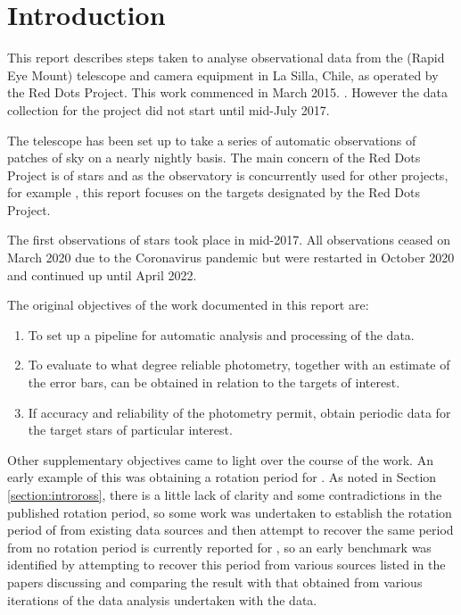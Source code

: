 \section{Introduction}
\protect\label{section:intro}

\engdate

This report describes steps taken to analyse observational data from the
{\rem} (Rapid Eye Mount) telescope and camera equipment in La Silla, Chile, as
operated by the Red Dots Project. This work commenced in March 2015.
\citep{reddotsspace20}. However the data collection for the project did not
start until mid-July 2017.

The {\rem} telescope has been set up to take a series of automatic
observations of patches of sky on a nearly nightly basis. The main concern of
the Red Dots Project is of {\rdwarf} stars and as the {\rem} observatory is
concurrently used for other projects, for example \citet{giannini18}, this
report focuses on the {\rdwarf} targets designated by the Red Dots Project.

The first observations of {\rdwarf} stars took place in mid-2017. All
observations ceased on March 2020 due to the Coronavirus pandemic but were
restarted in October 2020 and continued up until April 2022.

The original objectives of the work documented in this report are:
\begin{enumerate}
  \item To set up a pipeline for automatic analysis and processing of the data.
  \item To evaluate to what degree reliable photometry, together with an
  estimate of the error bars, can be obtained in relation to the targets of
  interest.
  \item If accuracy and reliability of the photometry permit, obtain periodic
  data for the target stars of particular interest.
\end{enumerate}

Other supplementary objectives came to light over the course of the work. An
early example of this was obtaining a rotation period for \ross. As noted in
Section \ref{section:introross}, there is a little lack of clarity and some
contradictions in the published rotation period, so some work was undertaken to
establish the rotation period of {\ross} from existing data sources and then
attempt to recover the same period from  no rotation period is currently
reported for \ross, so an early benchmark was identified by attempting to
recover this period from various sources listed in the papers discussing {\ross}
and comparing the result with that obtained from various iterations of the data
analysis undertaken with the {\rem} data.

